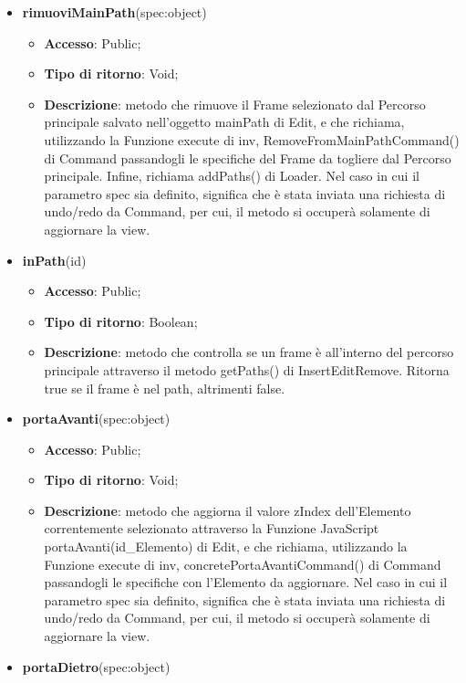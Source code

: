 {{\begin{itemize}
\begin{itemize}
			\end{itemize}
			\item \textbf{rimuoviMainPath}(spec:object)
			\begin{itemize}
				\item \textbf{Accesso}: Public;
				\item \textbf{Tipo di ritorno}: Void;
				\item \textbf{Descrizione}: metodo che rimuove il Frame selezionato dal Percorso principale salvato nell'oggetto mainPath di Edit, e che richiama, utilizzando la Funzione execute di inv, RemoveFromMainPathCommand() di Command passandogli le specifiche del Frame da togliere dal Percorso principale. Infine, richiama addPaths() di Loader. Nel caso in cui il parametro spec sia definito, significa che è stata inviata una richiesta di undo/redo da Command, per cui, il metodo si occuperà solamente di aggiornare la view.
			\end{itemize}
			\item \textbf{inPath}(id)
			\begin{itemize}
				\item \textbf{Accesso}: Public;
				\item \textbf{Tipo di ritorno}: Boolean;
				\item \textbf{Descrizione}: metodo che controlla se un frame è all'interno del percorso principale attraverso il metodo getPaths() di InsertEditRemove. Ritorna true se il frame è nel path, altrimenti false.
			\end{itemize}
			\item \textbf{portaAvanti}(spec:object)
			\begin{itemize}
				\item \textbf{Accesso}: Public;
				\item \textbf{Tipo di ritorno}: Void;
				\item \textbf{Descrizione}: metodo che aggiorna il valore zIndex dell'Elemento correntemente selezionato attraverso la Funzione\ped{g} JavaScript portaAvanti(id\_Elemento) di Edit, e che richiama, utilizzando la Funzione execute di inv, concretePortaAvantiCommand() di Command passandogli le specifiche con l'Elemento da aggiornare. Nel caso in cui il parametro spec sia definito, significa che è stata inviata una richiesta di undo/redo da Command, per cui, il metodo si occuperà solamente di aggiornare la view.
			\end{itemize}
			\item \textbf{portaDietro}(spec:object)

\end{itemize}}}
